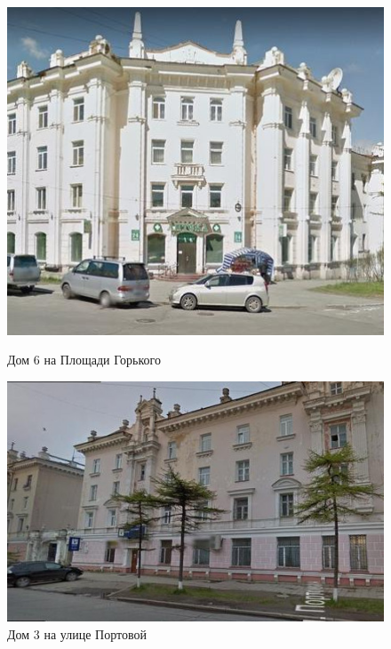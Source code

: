 \begin{figure}[H]
\begin{changemargin}{-0.5cm}{-1cm}
  \begin{center}
    \begin{minipage}[h]{0.38\linewidth}
        \includegraphics[width=1\textwidth]{authors/sydchak-fig-1.jpg}
        \caption{Дом 6 на Площади Горького}
        \label{fig:sydchak-fig-1}
    \end{minipage}
\hfill
    \begin{minipage}[h]{0.50\linewidth}
        \includegraphics[width=1\textwidth]{authors/sydchak-fig-2.jpg}
        \caption{Дом 3 на улице Портовой}
        \label{fig:sydchak-fig-2}
    \end{minipage}


  \end{center}
\end{changemargin}

\end{figure}
